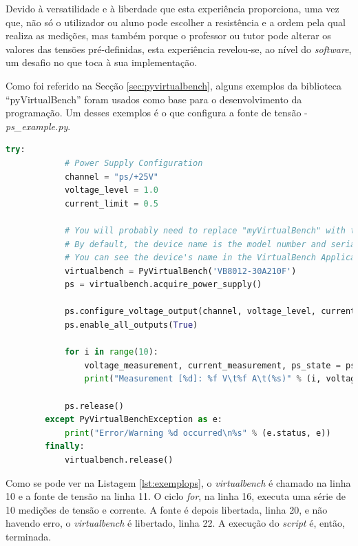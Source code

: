 Devido à versatilidade e à liberdade que esta experiência proporciona, uma vez que, não só o utilizador ou aluno pode escolher a resistência e a ordem pela qual realiza as medições, mas também porque o professor ou tutor pode alterar os valores das tensões pré-definidas, esta experiência revelou-se, ao nível do \textit{software}, um desafio no que toca à sua implementação.

Como foi referido na Secção \ref{sec:pyvirtualbench}, alguns exemplos da biblioteca ``pyVirtualBench'' foram usados como base para o desenvolvimento da programação. Um desses exemplos é o que configura a fonte de tensão - \textit{ps\_example.py}.


\begin{minipage}{0.9\linewidth}
	\begin{lstlisting}[language=Python, caption=Exemplo \textit{ps\_example.py}, label=lst:exemplops]
		try:
			# Power Supply Configuration
			channel = "ps/+25V"
			voltage_level = 1.0
			current_limit = 0.5

			# You will probably need to replace "myVirtualBench" with the name of your device.
			# By default, the device name is the model number and serial number separated by a hyphen; e.g., "VB8012-309738A".
			# You can see the device's name in the VirtualBench Application under File->About
			virtualbench = PyVirtualBench('VB8012-30A210F')
			ps = virtualbench.acquire_power_supply()

			ps.configure_voltage_output(channel, voltage_level, current_limit)
			ps.enable_all_outputs(True)

			for i in range(10):
				voltage_measurement, current_measurement, ps_state = ps.read_output(channel)
				print("Measurement [%d]: %f V\t%f A\t(%s)" % (i, voltage_measurement, current_measurement, str(ps_state)))

			ps.release()
		except PyVirtualBenchException as e:
    		print("Error/Warning %d occurred\n%s" % (e.status, e))
		finally:
    		virtualbench.release()

	\end{lstlisting}
\end{minipage}

Como se pode ver na Listagem \ref{lst:exemplops}, o \textit{virtualbench} é chamado na linha 10 e a fonte de tensão na linha 11. O ciclo \textit{for}, na linha 16, executa uma série de 10 medições de tensão e corrente. A fonte é depois libertada, linha 20, e não havendo erro, o \textit{virtualbench} é libertado, linha 22. A execução do \textit{script} é, então, terminada.

